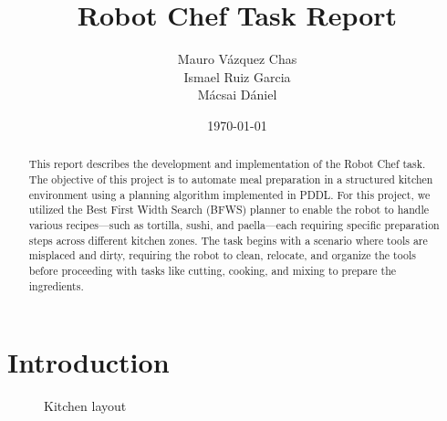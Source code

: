 \documentclass[a4paper,12pt]{article}
\title{Robot Chef Task Report}
\author{Mauro Vázquez Chas \\
Ismael Ruiz Garcia \\
Mácsai Dániel
}
\date{\today}
\begin{document}
\maketitle

\begin{abstract}
    This report describes the development and implementation of the Robot Chef task. The objective of this project is to automate meal preparation in a structured kitchen environment using a planning algorithm implemented in PDDL. For this project, we utilized the Best First Width Search (BFWS) planner to enable the robot to handle various recipes—such as tortilla, sushi, and paella—each requiring specific preparation steps across different kitchen zones. The task begins with a scenario where tools are misplaced and dirty, requiring the robot to clean, relocate, and organize the tools before proceeding with tasks like cutting, cooking, and mixing to prepare the ingredients.
\end{abstract}

\newpage
\tableofcontents
\newpage

\section{Introduction}
\label{sec:introduction}
\begin{wrapfigure}{r}{0.5\textwidth}
    \centering
    \caption{Kitchen layout}
    \label{fig:kitchen_layout}
\end{wrapfigure}
\end{document}
